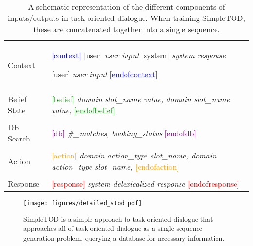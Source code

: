 \documentclass{article}
\begin{document}
\begin{table}[htb!]
\small
\centering
\begin{tabular}{|l|l|}
\hline
Context & 
    \textcolor{blue}{[context]} 
    \textcolor{TealBlue}{[user]} 
    \textit{user input}
    \textcolor{Periwinkle}{[system]} 
    \textit{system response}
    
    \textcolor{TealBlue}{[user]} 
    \textit{user input} 
    \textcolor{blue}{[endofcontext]}
    \\& \\
Belief State &
 \textcolor{green}{[belief]}
 \textit{domain slot\_name value, domain slot\_name value, }
 \textcolor{green}{[endofbelief]}
 \\
 & \\
DB Search &  
\textcolor{purple}{[db]}
 \textit{\#\_matches, booking\_status}
 \textcolor{purple}{[endofdb]}
 \\& \\
Action & 
\textcolor{orange}{[action]}
 \textit{domain action\_type slot\_name, domain action\_type slot\_name, }  
 \textcolor{orange}{[endofaction]}
 \\& \\
Response &  
\textcolor{red}{[response]}
 \textit{system delexicalized response}
 \textcolor{red}{[endofresponse]}
 \\
\hline
\end{tabular}
\vspace{1mm}
\caption{A schematic representation of the different components of inputs/outputs in task-oriented dialogue. When training SimpleTOD, these are concatenated together into a single sequence.}
\label{tab:method}
\end{table}


\begin{figure*}[htb!]
\centering
\texttt{[image: figures/detailed\_stod.pdf]}\\

  \caption{SimpleTOD is a simple approach to task-oriented dialogue that approaches all of task-oriented dialogue as a single sequence generation problem, querying a database for necessary information. 
}
  \label{fig:model}
\end{figure*}






\clearpage
\end{document}
